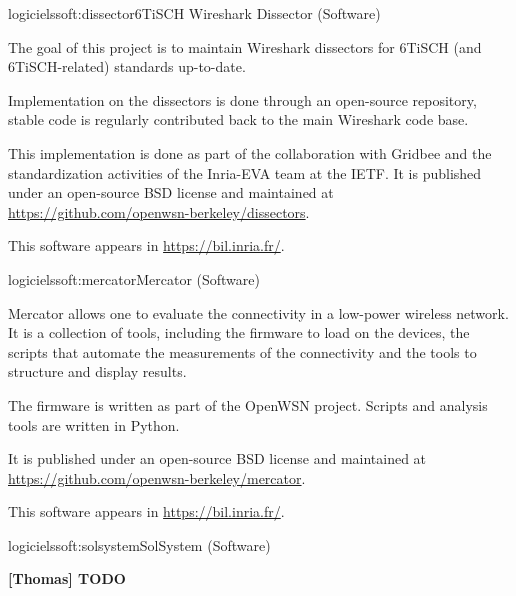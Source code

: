 \documentclass{ra2016}
\newcommand{\commentthomas}[1] {\textbf{[Thomas] #1}}
\begin{document}
\begin{module}{logiciels}{soft:dissector}{6TiSCH Wireshark Dissector (Software)}

\begin{participants}
\end{participants}

The goal of this project is to maintain Wireshark dissectors for 6TiSCH (and 6TiSCH-related) standards up-to-date.

Implementation on the dissectors is done through an open-source repository, stable code is regularly contributed back to the main Wireshark code base.

This implementation is done as part of the collaboration with Gridbee and the standardization activities of the Inria-EVA team at the IETF.
It is published under an open-source BSD license and maintained at \url{https://github.com/openwsn-berkeley/dissectors}.

This software appears in \url{https://bil.inria.fr/}.

\end{module}

\begin{module}{logiciels}{soft:mercator}{Mercator (Software)}

\begin{participants}
\end{participants}

Mercator allows one to evaluate the connectivity in a low-power wireless network.
It is a collection of tools, including the firmware to load on the devices, the scripts that automate the measurements of the connectivity and the tools to structure and display results.

The firmware is written as part of the OpenWSN project.
Scripts and analysis tools are written in Python.

It is published under an open-source BSD license and maintained at \url{https://github.com/openwsn-berkeley/mercator}.

This software appears in \url{https://bil.inria.fr/}.

\end{module}

\begin{module}{logiciels}{soft:solsystem}{SolSystem (Software)}

\commentthomas{TODO}

\end{module}
\end{document}
